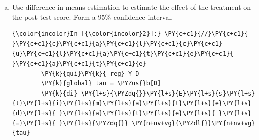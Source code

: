 \documentclass[11pt,notitlepage]{article}\usepackage[]{graphicx}\usepackage[]{color}
\makeatletter
\newenvironment{kframe}{%
 \def\at@end@of@kframe{}%
 \ifinner\ifhmode%
  \def\at@end@of@kframe{\end{minipage}}%
  \begin{minipage}{\columnwidth}%
 \fi\fi%
 \def\FrameCommand##1{\hskip\@totalleftmargin \hskip-\fboxsep
 \colorbox{shadecolor}{##1}\hskip-\fboxsep
     \hskip-\linewidth \hskip-\@totalleftmargin \hskip\columnwidth}%
 \MakeFramed {\advance\hsize-\width
   \@totalleftmargin\z@ \linewidth\hsize
   \@setminipage}}%
 {\par\unskip\endMakeFramed%
 \at@end@of@kframe}
\newenvironment{knitrout}{}{} %
\makeatother
\begin{document}
\begin{enumerate}[a)]
\begin{knitrout}
\begin{kframe}
    \begin{Verbatim}[commandchars=\\\{\}]
Two-sample randomization test for theta=r(Fs) of Fstat by D

Combinations:   48620 = (18 choose 9)
Assuming null=0
Observed theta: 1.274

Minimum time needed for exact test (h:m:s):  0:03:38
Mode: exact

progress: |{\ldots}|

 p=0.31345 [one-tailed test of Ho:  theta(D==0)<=theta(D==1)]
 p=0.76851 [one-tailed test of Ho:  theta(D==0)>=theta(D==1)]
 p=0.31345 [two-tailed test of Ho:  theta(D==0)==theta(D==1)]

Saving log file to 4\_2\_Fstat.dta{\ldots}done.

Fstat = 1.2743363

p.value= .31345125

    \end{Verbatim}

\end{kframe}
\end{knitrout}

We calculated the F-statistic of a regression of treatment assignment on the pretest score for all possible randomizations, and found that the observed F-statistic was larger than 31.35\% of the simulated statistics, implying a $p$-value of 0.313. As expected,we fail to reject the null hypothesis that the treatment assignment is unrelated to the pretreatment covariate, pretest.

\item Use difference-in-means estimation to estimate the effect of the treatment on the post-test score.  Form a 95\% confidence interval.\\

\begin{knitrout}
\color{fgcolor}\begin{kframe}
    \begin{Verbatim}[commandchars=\\\{\}]
{\color{incolor}In [{\color{incolor}2}]:} \PY{c+c1}{//}\PY{c+c1}{ }\PY{c+c1}{c}\PY{c+c1}{a}\PY{c+c1}{l}\PY{c+c1}{c}\PY{c+c1}{u}\PY{c+c1}{l}\PY{c+c1}{a}\PY{c+c1}{t}\PY{c+c1}{e}\PY{c+c1}{ }\PY{c+c1}{a}\PY{c+c1}{t}\PY{c+c1}{e}
        \PY{k}{qui}\PY{k}{ reg} Y D
        \PY{k}{global} tau = \PYZus{}b[D]
        \PY{k}{di} \PY{l+s}{\PYZdq{}}\PY{l+s}{E}\PY{l+s}{s}\PY{l+s}{t}\PY{l+s}{i}\PY{l+s}{m}\PY{l+s}{a}\PY{l+s}{t}\PY{l+s}{e}\PY{l+s}{d}\PY{l+s}{ }\PY{l+s}{a}\PY{l+s}{t}\PY{l+s}{e}\PY{l+s}{ }\PY{l+s}{=}\PY{l+s}{ }\PY{l+s}{\PYZdq{}} \PY{n+nv+vg}{\PYZdl{}}\PY{n+nv+vg}{tau}
        

\end{Verbatim}
\end{kframe}
\end{knitrout}
\end{enumerate}
\end{document}
